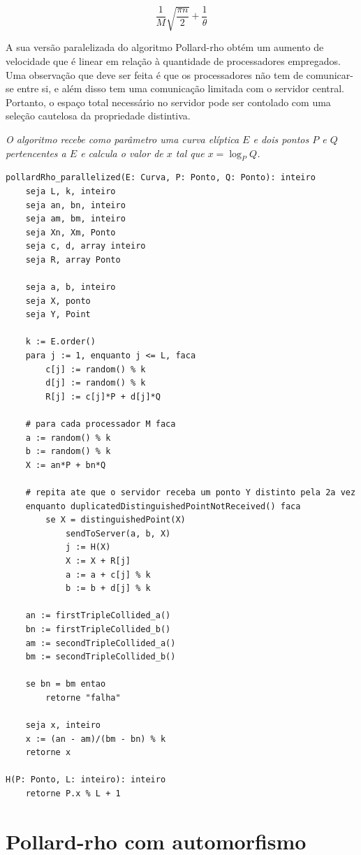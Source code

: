 \begin{equation}
\dfrac{1}{M} \sqrt{\dfrac{\pi n}{2}} + \dfrac{1}{\theta}
\end{equation}

A sua versão paralelizada do algoritmo Pollard-rho obtém um aumento de velocidade que é linear em relação à quantidade de processadores empregados. Uma observação que deve ser feita é que os processadores não tem de comunicar-se entre si, e além disso tem uma comunicação limitada com o servidor central. Portanto, o espaço total necessário no servidor pode ser contolado com uma seleção cautelosa da propriedade distintiva.

\textit{O algoritmo recebe como parâmetro uma curva elíptica \(E\) e dois pontos \(P\) e \(Q\) pertencentes a \(E\) e calcula o valor de \(x\) tal que $x = \log_P Q$.}

%
%
\begin{lstlisting}[caption={Algoritmo Pollard-rho paralelizado.},label=parallelized]
pollardRho_parallelized(E: Curva, P: Ponto, Q: Ponto): inteiro
	seja L, k, inteiro
	seja an, bn, inteiro
	seja am, bm, inteiro
	seja Xn, Xm, Ponto
	seja c, d, array inteiro
	seja R, array Ponto

	seja a, b, inteiro
	seja X, ponto
	seja Y, Point

	k := E.order()
	para j := 1, enquanto j <= L, faca
		c[j] := random() % k
		d[j] := random() % k
		R[j] := c[j]*P + d[j]*Q

	# para cada processador M faca
	a := random() % k
	b := random() % k
	X := an*P + bn*Q

	# repita ate que o servidor receba um ponto Y distinto pela 2a vez
	enquanto duplicatedDistinguishedPointNotReceived() faca
		se X = distinguishedPoint(X)
			sendToServer(a, b, X)
			j := H(X)
			X := X + R[j]
			a := a + c[j] % k
			b := b + d[j] % k

	an := firstTripleCollided_a()
	bn := firstTripleCollided_b()
	am := secondTripleCollided_a()
	bm := secondTripleCollided_b()

	se bn = bm entao
		retorne "falha"

	seja x, inteiro
	x := (an - am)/(bm - bn) % k
	retorne x

H(P: Ponto, L: inteiro): inteiro
	retorne P.x % L + 1

\end{lstlisting}

%
%
\section{Pollard-rho com automorfismo}


